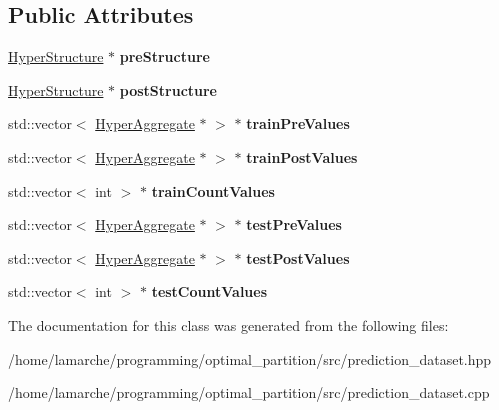 \subsection*{Public Attributes}
\begin{DoxyCompactItemize}
\item 
\hypertarget{classPredictionDataset_abac7d86c5cf82ea8e5fb1d7f98bc6c4a}{\hyperlink{classHyperStructure}{Hyper\-Structure} $\ast$ {\bfseries pre\-Structure}}\label{classPredictionDataset_abac7d86c5cf82ea8e5fb1d7f98bc6c4a}

\item 
\hypertarget{classPredictionDataset_acca2a4ad66b8e358b2eda61a88b49c0c}{\hyperlink{classHyperStructure}{Hyper\-Structure} $\ast$ {\bfseries post\-Structure}}\label{classPredictionDataset_acca2a4ad66b8e358b2eda61a88b49c0c}

\item 
\hypertarget{classPredictionDataset_aa1c6436547966c41ab17887319fd01d8}{std\-::vector$<$ \hyperlink{classHyperAggregate}{Hyper\-Aggregate} $\ast$ $>$ $\ast$ {\bfseries train\-Pre\-Values}}\label{classPredictionDataset_aa1c6436547966c41ab17887319fd01d8}

\item 
\hypertarget{classPredictionDataset_a19ed4275844fed49e8d3ae611091bce0}{std\-::vector$<$ \hyperlink{classHyperAggregate}{Hyper\-Aggregate} $\ast$ $>$ $\ast$ {\bfseries train\-Post\-Values}}\label{classPredictionDataset_a19ed4275844fed49e8d3ae611091bce0}

\item 
\hypertarget{classPredictionDataset_af4fdcf7cfd236a99a73f18d630199291}{std\-::vector$<$ int $>$ $\ast$ {\bfseries train\-Count\-Values}}\label{classPredictionDataset_af4fdcf7cfd236a99a73f18d630199291}

\item 
\hypertarget{classPredictionDataset_a2c725f63f44569b53ee512953d7bcda8}{std\-::vector$<$ \hyperlink{classHyperAggregate}{Hyper\-Aggregate} $\ast$ $>$ $\ast$ {\bfseries test\-Pre\-Values}}\label{classPredictionDataset_a2c725f63f44569b53ee512953d7bcda8}

\item 
\hypertarget{classPredictionDataset_ad28e0716996497d5512affc580bd899e}{std\-::vector$<$ \hyperlink{classHyperAggregate}{Hyper\-Aggregate} $\ast$ $>$ $\ast$ {\bfseries test\-Post\-Values}}\label{classPredictionDataset_ad28e0716996497d5512affc580bd899e}

\item 
\hypertarget{classPredictionDataset_a7fe2eccbdae1cee136f5864b660c31ee}{std\-::vector$<$ int $>$ $\ast$ {\bfseries test\-Count\-Values}}\label{classPredictionDataset_a7fe2eccbdae1cee136f5864b660c31ee}

\end{DoxyCompactItemize}


The documentation for this class was generated from the following files\-:\begin{DoxyCompactItemize}
\item 
/home/lamarche/programming/optimal\-\_\-partition/src/prediction\-\_\-dataset.\-hpp\item 
/home/lamarche/programming/optimal\-\_\-partition/src/prediction\-\_\-dataset.\-cpp\end{DoxyCompactItemize}
